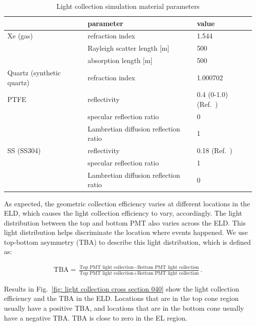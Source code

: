 	\begin{table}[!h]
		\centering
		\begin{tabular}[!h]{ | m{12em} m{16em} || m{10em}|} 
			\hline
			&parameter &    value \\\hline\hline
			Xe (gas)   
			& refraction index & 1.544 \\
			& Rayleigh scatter length [m] & 500 \\
							& absorption length [m] &	500  \\
							\hline
			Quartz (synthetic quartz)   
				& refraction index & 1.000702 \\
							\hline
			PTFE 	   
			& reflectivity & 0.4 (0-1.0) (Ref.~\cite{Feuerbacher1972}) \\
						  &	 specular reflection ratio & 0\\
						  & Lambretian diffusion reflection ratio & 1\\
						  \hline
			SS (SS304)   & reflectivity & 0.18 (Ref.~\cite{Feuerbacher1972}) \\
						& specular reflection ratio & 1\\
						& Lambretian diffusion reflection ratio & 0\\
			\hline    
		\end{tabular}
		\caption[Light collection simulation material parameters.]{Light collection simulation material parameters}
		\label{tab:LC sim parameter material}
	\end{table}

As expected, the geometric collection efficiency varies at different locations in the ELD, which causes the light collection efficiency to vary, accordingly. %
The light distribution between the top and bottom PMT also varies across the ELD. This light distribution helps discriminate the location where events happened. We use top-bottom asymmetry (TBA) to describe this light distribution, which is defined as: 

\begin{align}
	\text{TBA} = \frac{\text{Top PMT light collection}-\text{Bottom PMT light collection}}{\text{Top PMT light collection}+\text{Bottom PMT light collection}}.
\end{align}

Results in Fig.~\ref{fig: light collection cross section 040} show the light collection efficiency and the TBA in the ELD. Locations that are in the top cone region usually have a positive TBA, and locations that are in the bottom cone usually have a negative TBA. TBA is close to zero in the EL region. 

